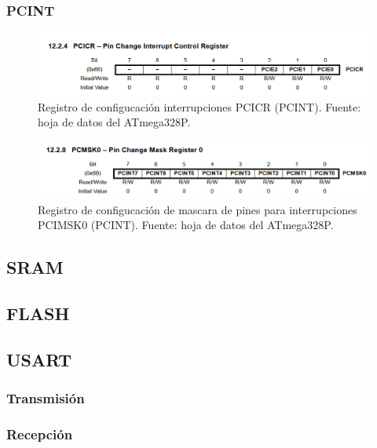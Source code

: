     \subsubsection{PCINT}

    \begin{figure}[H]
    \centering
    \includegraphics[width=\linewidth]{./Anexos/Marco Teorico/External Interrupts/PCICR.png}
    \caption{Registro de configucación interrupciones PCICR (PCINT). Fuente: hoja de datos del ATmega328P\@\cite{atmega328p_datasheet}.}
    \label{fig:PCICR}
    \end{figure}

    \begin{figure}[H]
    \centering
    \includegraphics[width=\linewidth]{./Anexos/Marco Teorico/External Interrupts/PCMSK.png}
    \caption{Registro de configucación de mascara de pines para interrupciones PCIMSK0 (PCINT). Fuente: hoja de datos del ATmega328P\@\cite{atmega328p_datasheet}.}
    \label{fig:PCIMSK}
    \end{figure}



\subsection{SRAM}
\subsection{FLASH}
\subsection{USART}
    \subsubsection{Transmisión}
    \subsubsection{Recepción}
